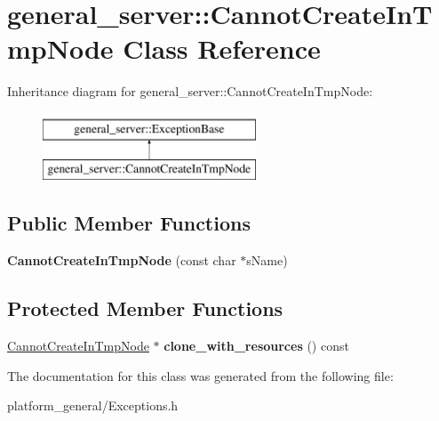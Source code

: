 \hypertarget{classgeneral__server_1_1CannotCreateInTmpNode}{\section{general\-\_\-server\-:\-:\-Cannot\-Create\-In\-Tmp\-Node \-Class \-Reference}
\label{classgeneral__server_1_1CannotCreateInTmpNode}
}
\-Inheritance diagram for general\-\_\-server\-:\-:\-Cannot\-Create\-In\-Tmp\-Node\-:\begin{figure}[H]
\begin{center}
\leavevmode
\includegraphics[height=2.000000cm]{classgeneral__server_1_1CannotCreateInTmpNode}
\end{center}
\end{figure}
\subsection*{\-Public \-Member \-Functions}
\begin{DoxyCompactItemize}
\item 
\hypertarget{classgeneral__server_1_1CannotCreateInTmpNode_a86c23db66d50899427d01f600dcd0692}{{\bfseries \-Cannot\-Create\-In\-Tmp\-Node} (const char $\ast$s\-Name)}\label{classgeneral__server_1_1CannotCreateInTmpNode_a86c23db66d50899427d01f600dcd0692}

\end{DoxyCompactItemize}
\subsection*{\-Protected \-Member \-Functions}
\begin{DoxyCompactItemize}
\item 
\hypertarget{classgeneral__server_1_1CannotCreateInTmpNode_a2d31052ae1afa8dc7cfbc8edc287450b}{\hyperlink{classgeneral__server_1_1CannotCreateInTmpNode}{\-Cannot\-Create\-In\-Tmp\-Node} $\ast$ {\bfseries clone\-\_\-with\-\_\-resources} () const }\label{classgeneral__server_1_1CannotCreateInTmpNode_a2d31052ae1afa8dc7cfbc8edc287450b}

\end{DoxyCompactItemize}


\-The documentation for this class was generated from the following file\-:\begin{DoxyCompactItemize}
\item 
platform\-\_\-general/\-Exceptions.\-h\end{DoxyCompactItemize}
